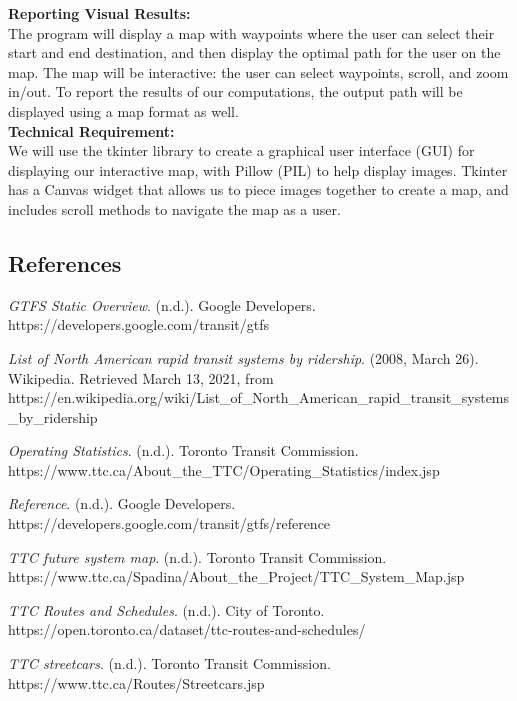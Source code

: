 \documentclass[fontsize=11pt]{article}
\begin{document}
    \noindent \textbf{Reporting Visual Results:} \\
    \indent The program will display a map with waypoints where the user can select their start and end destination, and then display the optimal path for the user on the map. The map will be interactive: the user can select waypoints, scroll, and zoom in/out. To report the results of our computations, the output path will be displayed using a map format as well. \\

    \noindent \textbf{Technical Requirement:} \\
    \indent We will use the tkinter library to create a graphical user interface (GUI) for displaying our interactive map, with Pillow (PIL) to help display images. Tkinter has a Canvas widget that allows us to piece images together to create a map, and includes scroll methods to navigate the map as a user.

    \newpage

    \begin{center}
        \section*{References}
    \end{center}

    \hangindent=0.75in
    \textit{GTFS Static Overview}. (n.d.). Google Developers. https://developers.google.com/transit/gtfs

    \hangindent=0.75in
    \textit{List of North American rapid transit systems by ridership}. (2008, March 26). Wikipedia. Retrieved March 13, 2021, from https://en.wikipedia.org/wiki/List\_of\_North\_American\_rapid\_transit\_systems\_by\_ridership

    \hangindent=0.75in
    \textit{Operating Statistics}. (n.d.). Toronto Transit Commission. \\
    https://www.ttc.ca/About\_the\_TTC/Operating\_Statistics/index.jsp

    \hangindent=0.75in
    \textit{Reference}. (n.d.). Google Developers. https://developers.google.com/transit/gtfs/reference

    \hangindent=0.75in
    \textit{TTC future system map}. (n.d.). Toronto Transit Commission. \\
    https://www.ttc.ca/Spadina/About\_the\_Project/TTC\_System\_Map.jsp

    \hangindent=0.75in
    \textit{TTC Routes and Schedules}. (n.d.). City of Toronto. \\
    https://open.toronto.ca/dataset/ttc-routes-and-schedules/

    \hangindent=0.75in
    \textit{TTC streetcars}. (n.d.). Toronto Transit Commission. https://www.ttc.ca/Routes/Streetcars.jsp
\end{document}

